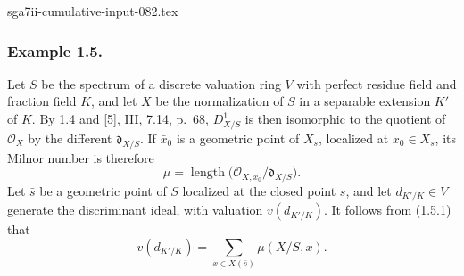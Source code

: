 \begin{filecontents*}{sga7ii-cumulative-input-082.tex}
\subsubsection*{Example 1.5.}
Let $S$ be the spectrum of a discrete valuation ring $V$ with
perfect residue field and fraction field $K$, and let $X$ be the
normalization of $S$ in a separable extension $K'$ of $K$.  By 1.4
and [5], III, 7.14, p.~68, $D^1_{X/S}$ is then isomorphic to the
quotient of $\mathcal O_X$ by the different $\mathfrak d_{X/S}$.  If
$\bar x_0$ is a geometric point of $X_s$, localized at
$x_0\in X_s$, its Milnor number is therefore
\begin{equation}\tag{1.5.1}
\mu=\operatorname{length}
\bigl(\mathcal O_{X,x_0}/\mathfrak d_{X/S}\bigr).
\end{equation}
Let $\bar s$ be a geometric point of $S$ localized at the closed
point $s$, and let $d_{K'/K}\in V$ generate the discriminant ideal,
with valuation $v(d_{K'/K})$.  It follows from (1.5.1) that
\begin{equation}\tag{1.5.2}
v(d_{K'/K})=\sum_{x\in X(\bar s)}\mu(X/S,x).
\end{equation}
\end{filecontents*}
